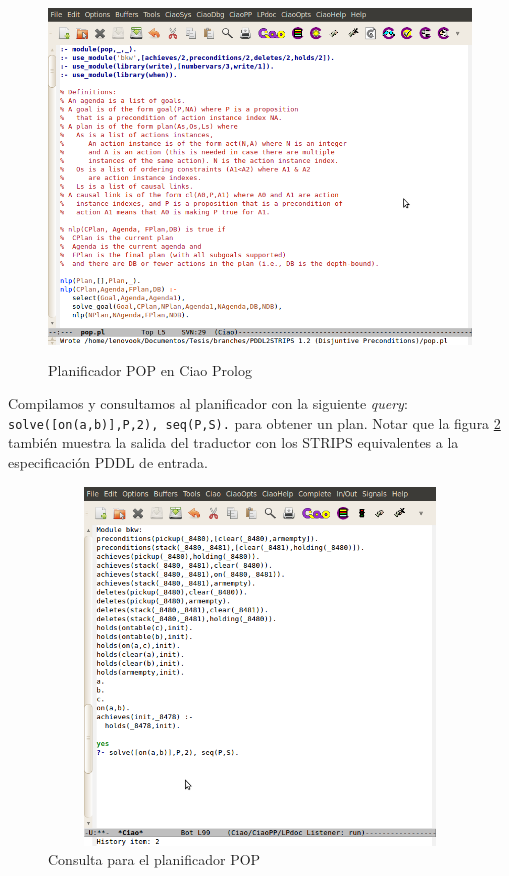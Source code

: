   \begin{figure}[h!]
  \centering
  \includegraphics[width=12cm,height=9.5cm]{demoPOP.png} 
       \caption{Planificador POP en Ciao Prolog}
	\label{demo:pop}
   \end{figure}     

   Compilamos y consultamos al planificador con la siguiente
   \emph{query}: \texttt{solve([on(a,b)],P,2), seq(P,S).} para obtener
   un plan.
   Notar que la figura \ref{demo:query} tambi\'en muestra la salida
   del traductor con los STRIPS equivalentes a la especificaci\'on
   PDDL de entrada.


  \begin{figure}[h!]
  \centering
  \includegraphics[width=12cm,height=9.5cm]{demoShowtransQuery.png} 
       \caption{Consulta para el planificador POP}
	\label{demo:query}
   \end{figure}

